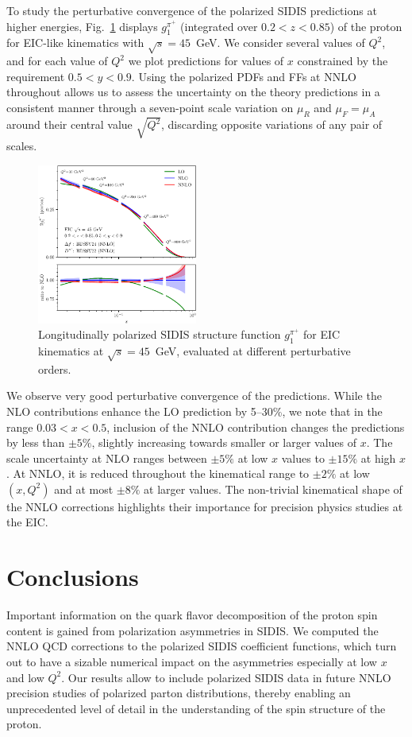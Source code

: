 \documentclass[10pt,aps,prl,twocolumn,preprintnumbers,nofootinbib]{revtex4-2}
\begin{document}
To  study the 
perturbative convergence of the polarized SIDIS
predictions
at higher energies, Fig.~\ref{fig:eic45g1} displays 
$g_1^{\pi^+}$ (integrated over $0.2<z<0.85$) of the proton 
for EIC-like kinematics with $\sqrt{s}=45$~GeV. 
We consider several values of $Q^2$, and for each value of $Q^2$ we plot predictions for values of $x$ constrained by the requirement $0.5 < y < 0.9$.
Using the 
 polarized PDFs and FFs at NNLO throughout allows 
us to assess the uncertainty on the theory 
predictions in a consistent manner 
through a seven-point scale variation on $\mu_R$ and $\mu_F=\mu_A$ around their central value
 $\sqrt{Q^2}$, discarding opposite variations of any pair of scales.
\begin{figure}[t]
    \centering
    \includegraphics[width=0.47\textwidth]{figure3.pdf}
    \caption{Longitudinally polarized SIDIS structure 
    function $g_1^{\pi^+}$ for EIC kinematics at $\sqrt{s}=45$~GeV, evaluated at different perturbative orders.}
    \label{fig:eic45g1}
\end{figure}

We observe very good perturbative convergence of the predictions. While the NLO contributions enhance  
the LO prediction by 5--30\%, we note that in the range $0.03 < x < 0.5$, inclusion of the 
 NNLO contribution changes the predictions by less than 
  $\pm 5\%$, slightly increasing towards smaller or larger values of $x$. 
  The scale uncertainty at NLO ranges between $\pm 5\%$ at low $x$ values to $\pm 15\%$
at high $x$. At NNLO, it is reduced throughout the kinematical range to $\pm 2\%$ at low $(x,Q^2)$ and 
at most $\pm 8\%$ at larger values. The non-trivial kinematical shape of the NNLO corrections 
highlights their importance for precision physics studies at the EIC. 


\section{Conclusions}
Important information on the quark flavor decomposition of
the proton spin content is gained from polarization 
asymmetries in SIDIS. We computed the NNLO QCD corrections 
to the polarized SIDIS coefficient functions, which 
turn out to have a sizable numerical impact 
on the asymmetries especially at low 
$x$ and low $Q^2$. Our results allow to include
polarized SIDIS data 
in future  NNLO precision studies of polarized parton 
distributions, thereby enabling an unprecedented
level of detail in the understanding of the 
spin structure of the proton. 
\end{document}
